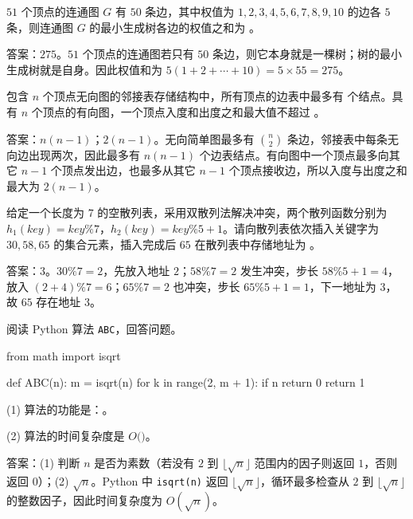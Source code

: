 \begin{question}
$51$ 个顶点的连通图 $G$ 有 $50$ 条边，其中权值为 $1,2,3,4,5,6,7,8,9,10$ 的边各 $5$ 条，则连通图 $G$ 的最小生成树各边的权值之和为 \blank。
\begin{solution}
答案：$275$。$51$ 个顶点的连通图若只有 $50$ 条边，则它本身就是一棵树；树的最小生成树就是自身。因此权值和为 $5(1+2+\cdots+10)=5\times55=275$。
\end{solution}
\end{question}

\begin{question}
包含 $n$ 个顶点无向图的邻接表存储结构中，所有顶点的边表中最多有 \blank 个结点。具有 $n$ 个顶点的有向图，一个顶点入度和出度之和最大值不超过 \blank。
\begin{solution}
答案：$n(n-1)$；$2(n-1)$。无向简单图最多有 $\binom{n}{2}$ 条边，邻接表中每条无向边出现两次，因此最多有 $n(n-1)$ 个边表结点。有向图中一个顶点最多向其它 $n-1$ 个顶点发出边，也最多从其它 $n-1$ 个顶点接收边，所以入度与出度之和最大为 $2(n-1)$。
\end{solution}
\end{question}

\begin{question}
给定一个长度为 $7$ 的空散列表，采用双散列法解决冲突，两个散列函数分别为 $h_1(key)=key\%7$，$h_2(key)=key\%5+1$。请向散列表依次插入关键字为 $30,58,65$ 的集合元素，插入完成后 $65$ 在散列表中存储地址为 \blank。
\begin{solution}
答案：$3$。$30\%7=2$，先放入地址 $2$；$58\%7=2$ 发生冲突，步长 $58\%5+1=4$，放入 $(2+4)\%7=6$；$65\%7=2$ 也冲突，步长 $65\%5+1=1$，下一地址为 $3$，故 $65$ 存在地址 $3$。
\end{solution}
\end{question}


\begin{question}
阅读 Python 算法 \texttt{ABC}，回答问题。
\begin{pycode}
from math import isqrt

def ABC(n):
    m = isqrt(n)
    for k in range(2, m + 1):
        if n %
            return 0
    return 1
\end{pycode}
(1) 算法的功能是：\blank。\par
(2) 算法的时间复杂度是 $O($\blank$)$。
\begin{solution}
答案：(1) 判断 $n$ 是否为素数（若没有 $2$ 到 $\lfloor\sqrt n\rfloor$ 范围内的因子则返回 $1$，否则返回 $0$）；(2) $\sqrt n$。Python 中 \texttt{isqrt(n)} 返回 $\lfloor\sqrt n\rfloor$，循环最多检查从 $2$ 到 $\lfloor\sqrt n\rfloor$ 的整数因子，因此时间复杂度为 $O(\sqrt n)$。
\end{solution}
\end{question}

